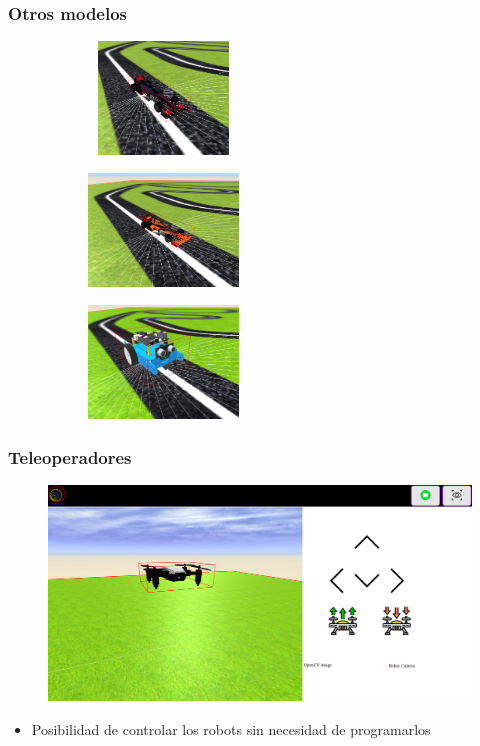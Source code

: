 \documentclass[xcolor={table}]{beamer}
\begin{document}
		\begin{frame}
			\frametitle{Otros modelos}
		\begin{figure}[H]
        \centering
        \begin{subfigure}{\textwidth}
         \includegraphics[width=4cm, height=3cm]{img/f1_williams.png}
 \label{fig:f1williams}
        \end{subfigure}
        \begin{subfigure}{\textwidth}
         \includegraphics[width=4cm, height=3cm]{img/f1_renault.png}
   \label{fig:f1renault}
        \end{subfigure}
        \begin{subfigure}{\textwidth}
         \includegraphics[width=4cm, height=3cm]{img/mBot_model.png}
   \label{fig:mbot}
        \end{subfigure}
        \end{figure}
		\end{frame}
		
		\begin{frame}
		\frametitle{Teleoperadores}
    		\begin{figure}{\textwidth}
    		\centering
             \includegraphics[scale=0.18]{img/drone_teleoperator.png}
             \label{fig:teleopdrone}
            \end{figure}
            	\begin{itemize}
    			\item Posibilidad de controlar los robots sin necesidad de programarlos
		    \end{itemize}
		\end{frame}
		
\end{document}
